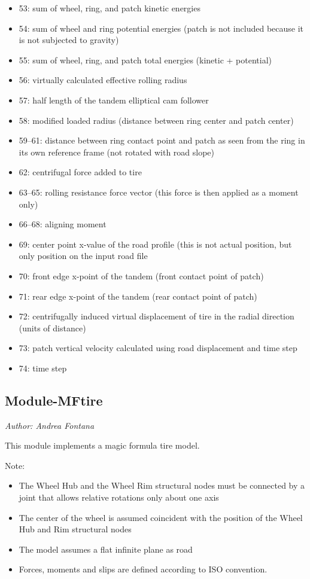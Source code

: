 \begin{itemize}
\item 53: sum of wheel, ring, and patch kinetic energies
\item 54: sum of wheel and ring potential energies (patch is not included because it is not subjected to gravity)
\item 55: sum of wheel, ring, and patch total energies (kinetic + potential)
\item 56: virtually calculated effective rolling radius
\item 57: half length of the tandem elliptical cam follower
\item 58: modified loaded radius (distance between ring center and patch center)
\item 59--61: distance between ring contact point and patch as seen from the ring in its own reference frame (not rotated with road slope)
\item 62: centrifugal force added to tire
\item 63--65: rolling resistance force vector (this force is then applied as a moment only)
\item 66--68: aligning moment
\item 69: center point x-value of the road profile (this is not actual position, but only position on the input road file
\item 70: front edge x-point of the tandem (front contact point of patch)
\item 71: rear edge x-point of the tandem (rear contact point of patch)
\item 72: centrifugally induced virtual displacement of tire in the radial direction (units of distance)
\item 73: patch vertical velocity calculated using road displacement and time step
\item 74: time step
\end{itemize}

\subsection{Module-MFtire}
\emph{Author: Andrea Fontana}

\noindent
This module implements a magic formula tire model.

Note:
\begin{itemize}
\item The Wheel Hub and the Wheel Rim structural nodes must be connected
     by a joint that allows relative rotations only about one axis
\item The center of the wheel is assumed coincident with
     the position of the Wheel Hub and Rim structural nodes
\item The model assumes a flat  infinite plane as road
\item Forces, moments and slips are defined according to ISO convention.
\end{itemize}

